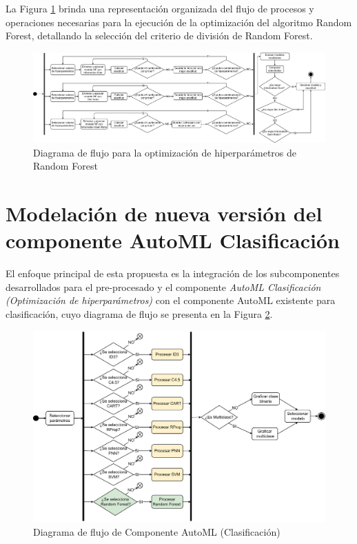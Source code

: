 La Figura \ref{fig:optimizacion-randomforest} brinda una representación organizada del flujo de procesos y operaciones necesarias para la ejecución de la optimización del algoritmo Random Forest, detallando la selección del criterio de división de Random Forest.


\begin{figure}[H]
	\centering
	\includegraphics[width=1\linewidth]{"figuras/capi 2/hpo/Optimizacion RandomForest"}
	\caption{Diagrama de flujo para la optimización de hiperparámetros de Random Forest}
	\label{fig:optimizacion-randomforest}
\end{figure}


\section{Modelación de nueva versión del componente AutoML Clasificación}
El enfoque principal de esta propuesta es la integración de los subcomponentes desarrollados para el pre-procesado y el componente \textit{AutoML Clasificación (Optimización de hiperparámetros)} con el componente AutoML existente para clasificación, cuyo diagrama de flujo se presenta en la Figura \ref{fig:diagrama-general-componente}. \\

\begin{figure}[H]
	\centering
	\includegraphics[width=0.9\linewidth]{"figuras/capi 2/Diagrama General Componente"}
	\caption{Diagrama de flujo de Componente AutoML (Clasificación)}
	\label{fig:diagrama-general-componente}
\end{figure}

